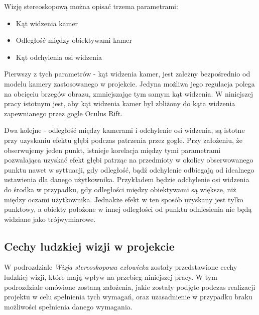 \documentclass[a4paper,11pt,twoside]{report}
\theoremstyle{definition}
\begin{document}
Wizję stereoskopową można opisać trzema parametrami:

\begin{itemize}
\item Kąt widzenia kamer
\item Odległość między obiektywami kamer
\item Kąt odchylenia osi widzenia
\end{itemize}

Pierwszy z tych parametrów - kąt widzenia kamer, jest zależny bezpośrednio od modelu kamery zastosowanego w projekcie. Jedyna możliwa jego regulacja polega na obcięciu brzegów obrazu, zmniejszając tym samym kąt widzenia. W niniejszej pracy istotnym jest, aby kąt widzenia kamer był zbliżony do kąta widzenia zapewnianego przez gogle Oculus Rift.

Dwa kolejne - odległość między kamerami i odchylenie osi widzenia, są istotne przy uzyskaniu efektu głębi podczas patrzenia przez gogle. Przy założeniu, że obserwujemy jeden punkt, istnieje korelacja między tymi parametrami pozwalająca uzyskać efekt głębi patrząc na przedmioty w okolicy obserwowanego punktu nawet w syttuacji, gdy odległość, bądź odchylenie odbiegają od idealnego ustawienia dla danego użytkownika. Przykładem będzie odchylenie osi widzenia do środka w przypadku, gdy odległości między obiektywami są większe, niż między oczami użytkownika. Jednakże efekt w ten sposób uzyskany jest tylko punktowy, a obiekty położone w innej odległości od punktu odniesienia nie będą widziane jako trójwymiarowe.

\subsection{Cechy ludzkiej wizji w projekcie}

W podrozdziale \textit{Wizja stereoskopowa człowieka} zostały przedstawione cechy ludzkiej wizji, które mają wpływ na przebieg niniejszej pracy. W tym podrozdziale omówione zostaną założenia, jakie zostały podjęte podczas realizacji projektu w celu spełnienia tych wymagań, oraz uzasadnienie w przypadku braku możliwości spełnienia danego wymagania.
\end{document}
